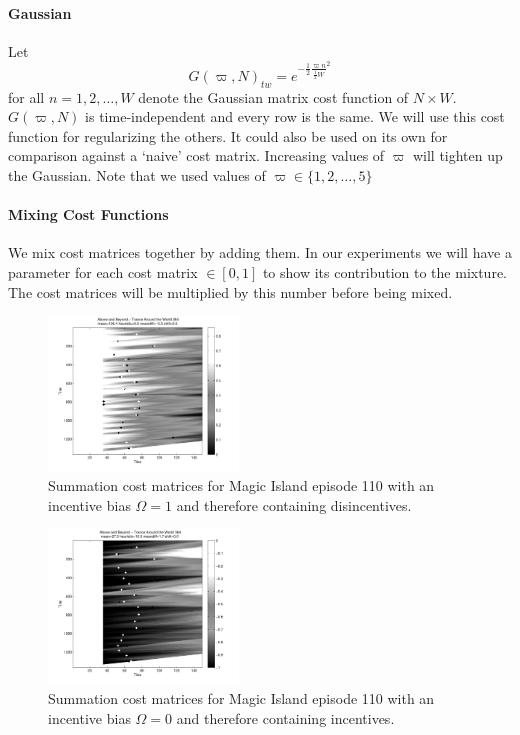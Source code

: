 \documentclass[twocolumn]{article}
\begin{document}
	\paragraph{Gaussian}
	Let \[
	G( \varpi, N )_{tw} = e^{ - \frac{1}{2} \frac{\varpi n}{ \frac{1}{2} W}^2  }
	\] for all $n=1,2,\ldots,W$ denote the Gaussian matrix cost function of $N\times W$. $G( \varpi, N )$ is time-independent and every row is the same. We will use this cost function for regularizing the others. It could also be used on its own for comparison against a `naive' cost matrix. Increasing values of $\varpi$ will tighten up the Gaussian. Note that we used values of $\varpi \in \{1,2,\ldots,5\}$
	
	\paragraph{Mixing Cost Functions}
	
	We mix cost matrices together by adding them. In our experiments we will have a parameter for each cost matrix $\in [0,1]$ to show its contribution to the mixture. The cost matrices will be multiplied by this number before being mixed. 
	
		\begin{figure}
			\centering
			\includegraphics[width=0.45\textwidth]{images/cmsumib0}
			\caption{Summation cost matrices for Magic Island episode 110 with an incentive bias $\Omega=1$ and therefore containing disincentives. }
			\label{fig:cmsumib1}
		\end{figure} 
		
		\begin{figure}
			\centering
			\includegraphics[width=0.45\textwidth]{images/cmsumib1}
			\caption{Summation cost matrices for Magic Island episode 110 with an incentive bias $\Omega=0$ and therefore containing incentives. }
			\label{fig:cmsumib2}
		\end{figure} 
		
\end{document}
